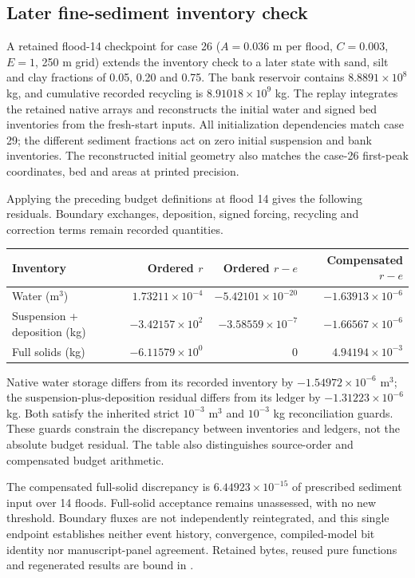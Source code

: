 \subsection{Later fine-sediment inventory check}
A retained flood-14 checkpoint for case 26 ($A=0.036$ m per flood,
$C=0.003$, $E=1$, 250 m grid) extends the inventory check to a later
state with sand, silt and clay fractions of 0.05, 0.20 and 0.75.
The bank reservoir contains $8.8891\times10^{8}$ kg, and cumulative recorded recycling
is $8.91018\times10^{9}$ kg. The replay integrates the retained native arrays and
reconstructs the initial water and signed bed inventories from the
fresh-start inputs. All initialization dependencies match case 29;
the different sediment fractions act on zero initial suspension and
bank inventories. The reconstructed initial geometry also matches
the case-26 first-peak coordinates, bed and areas at printed precision.

Applying the preceding budget definitions at flood 14 gives the
following residuals. Boundary exchanges, deposition, signed forcing,
recycling and correction terms remain recorded quantities.
\begin{center}\small
\begin{tabular}{lrrr}
\toprule
Inventory & Ordered $r$ & Ordered $r-e$ & Compensated $r-e$ \\
\midrule
Water (m$^3$) & $1.73211\times10^{-4}$ & $-5.42101\times10^{-20}$ & $-1.63913\times10^{-6}$ \\
Suspension + deposition (kg) & $-3.42157\times10^{2}$ & $-3.58559\times10^{-7}$ & $-1.66567\times10^{-6}$ \\
Full solids (kg) & $-6.11579\times10^{0}$ & $0$ & $4.94194\times10^{-3}$ \\
\bottomrule\end{tabular}\end{center}
Native water storage differs from its recorded inventory by $-1.54972\times10^{-6}$ m$^3$;
the suspension-plus-deposition residual differs from its ledger by $-1.31223\times10^{-6}$ kg.
Both satisfy the inherited strict $10^{-3}$ m$^3$ and $10^{-3}$ kg
reconciliation guards. These guards constrain the discrepancy between
inventories and ledgers, not the absolute budget residual. The table
also distinguishes source-order and compensated budget arithmetic.

The compensated full-solid discrepancy is $6.44923\times10^{-15}$ of prescribed sediment
input over 14 floods. Full-solid acceptance remains unassessed, with
no new threshold. Boundary fluxes are not independently reintegrated,
and this single endpoint establishes neither event history, convergence,
compiled-model bit identity nor manuscript-panel agreement. Retained
bytes, reused pure functions and regenerated results are bound in
.
